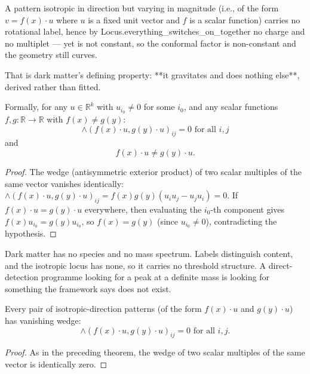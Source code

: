 \begin{theorem}
A pattern isotropic in direction but varying in magnitude (i.e., of the form $v = f(x) \cdot u$ where $u$ is a fixed unit vector and $f$ is a scalar function) carries no rotational label, hence by Locus.everything\_switches\_on\_together no charge and no multiplet — yet is not constant, so the conformal factor is non-constant and the geometry still curves.

That is dark matter's defining property: **it gravitates and does nothing else**, derived rather than fitted.

Formally, for any $u \in \mathbb{R}^k$ with $u_{i_0} \neq 0$ for some $i_0$, and any scalar functions $f, g : \mathbb{R} \to \mathbb{R}$ with $f(x) \neq g(y)$:
\begin{equation}
\wedge(f(x) \cdot u, g(y) \cdot u)_{ij} = 0 \text{ for all } i, j
\end{equation}
and
\begin{equation}
f(x) \cdot u \neq g(y) \cdot u.
\end{equation}
\begin{proof}
The wedge (antisymmetric exterior product) of two scalar multiples of the same vector vanishes identically: $\wedge(f(x) \cdot u, g(y) \cdot u)_{ij} = f(x) g(y) (u_i u_j - u_j u_i) = 0$.  If $f(x) \cdot u = g(y) \cdot u$ everywhere, then evaluating the $i_0$-th component gives $f(x) u_{i_0} = g(y) u_{i_0}$, so $f(x) = g(y)$ (since $u_{i_0} \neq 0$), contradicting the hypothesis.
\end{proof}
\end{theorem}

\begin{theorem}
Dark matter has no species and no mass spectrum.  Labels distinguish content, and the isotropic locus has none, so it carries no threshold structure.  A direct-detection programme looking for a peak at a definite mass is looking for something the framework says does not exist.

Every pair of isotropic-direction patterns (of the form $f(x) \cdot u$ and $g(y) \cdot u$) has vanishing wedge:
\begin{equation}
\wedge(f(x) \cdot u, g(y) \cdot u)_{ij} = 0 \text{ for all } i, j.
\end{equation}
\begin{proof}
As in the preceding theorem, the wedge of two scalar multiples of the same vector is identically zero.
\end{proof}
\end{theorem}


